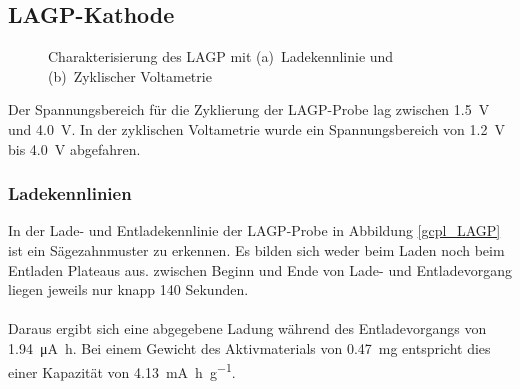 \documentclass[a4paper, 11pt, headsepline,footsepline,twoside,abstract]{scrbook}
\begin{document}
\subsection{LAGP-Kathode}
\begin{figure}[b!]
   \centering
       \vspace{3mm}
	\caption{Charakterisierung des LAGP mit (a)~Ladekennlinie und (b)~Zyklischer Voltametrie}
   	\label{ec_LAGP}
\end{figure}
Der Spannungsbereich für die Zyklierung der LAGP-Probe lag zwischen \SI{1.5}{\volt} und \SI{4.0}{\volt}. In der zyklischen Voltametrie wurde ein Spannungsbereich von \SI{1.2}{\volt} bis \SI{4.0}{\volt} abgefahren.
\subsubsection{Ladekennlinien}
In der Lade- und Entladekennlinie der LAGP-Probe in Abbildung \ref{gcpl_LAGP} ist ein Sägezahnmuster zu erkennen. Es bilden sich weder beim Laden noch beim Entladen Plateaus aus. zwischen Beginn und Ende von Lade- und Entladevorgang liegen jeweils nur knapp 140 Sekunden.
\\\\
Daraus ergibt sich eine abgegebene Ladung während des Entladevorgangs von \SI{1.94}{\micro\ampere\hour}. Bei einem Gewicht des Aktivmaterials von \SI{0.47}{\milli\gram} entspricht dies einer Kapazität von \SI{4.13}{\milli\ampere\hour\per\gram}.
\end{document}
